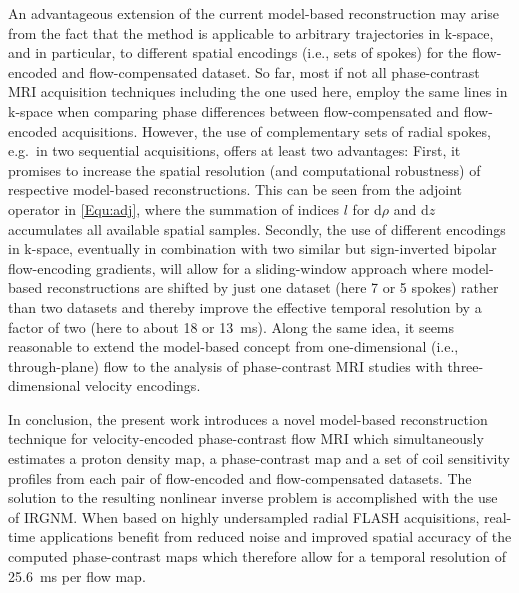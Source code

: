An advantageous extension of the current model-based reconstruction may arise from the fact that the method is applicable to arbitrary trajectories in k-space, and in particular, to different spatial encodings (i.e., sets of spokes) for the flow-encoded and flow-compensated dataset. So far, most if not all phase-contrast MRI acquisition techniques including the one used here, employ the same lines in k-space when comparing phase differences between flow-compensated and flow-encoded acquisitions. However, the use of complementary sets of radial spokes, e.g.~in two sequential acquisitions, offers at least two advantages: First, it promises to increase the spatial resolution (and computational robustness) of respective model-based reconstructions. This can be seen from the adjoint operator in \cref{Equ:adj}, where the summation of indices $l$ for d$\rho$ and d$z$ accumulates all available spatial samples. Secondly, the use of different encodings in k-space, eventually in combination with two similar but sign-inverted bipolar flow-encoding gradients, will allow for a sliding-window approach where model-based reconstructions are shifted by just one dataset (here \num{7} or \num{5} spokes) rather than two datasets and thereby improve the effective temporal resolution by a factor of two (here to about \num{18} or \SI{13}{\ms}). Along the same idea, it seems reasonable to extend the model-based concept from one-dimensional (i.e., through-plane) flow to the analysis of phase-contrast MRI studies with three-dimensional velocity encodings.

In conclusion, the present work introduces a novel model-based reconstruction technique for velocity-encoded phase-contrast flow MRI which simultaneously estimates a proton density map, a phase-contrast map and a set of coil sensitivity profiles from each pair of flow-encoded and flow-compensated datasets. The solution to the resulting nonlinear inverse problem is accomplished with the use of IRGNM. When based on highly undersampled radial FLASH acquisitions, real-time applications benefit from reduced noise and improved spatial accuracy of the computed phase-contrast maps which therefore allow for a temporal resolution of \SI{25.6}{\ms} per flow map.


